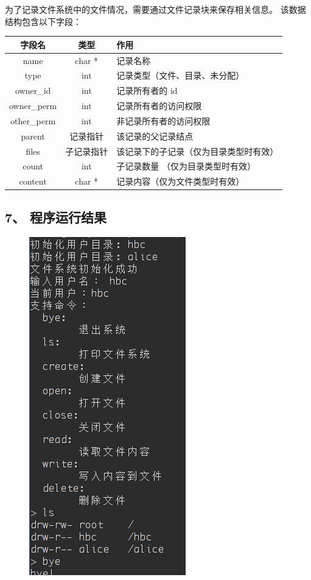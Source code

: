 \documentclass[12bp]{guo}
\begin{document}
为了记录文件系统中的文件情况，需要通过文件记录块来保存相关信息。
该数据结构包含以下字段：

\begin{table}[H]
    \centering
    \begin{tabular}{| c | c | l |}
        \hline
        字段名 & 类型 & 作用 \\ \hline
        name & char * & 记录名称 \\
        type & int & 记录类型（文件、目录、未分配） \\
        owner\_id & int & 记录所有者的 id \\
        owner\_perm & int & 记录所有者的访问权限 \\
        other\_perm & int & 非记录所有者的访问权限 \\
        parent & 记录指针 & 该记录的父记录结点 \\
        files & 子记录指针 & 该记录下的子记录（仅为目录类型时有效）\\
        count & int & 子记录数量 （仅为目录类型时有效） \\
        content & char * & 记录内容（仅为文件类型时有效） \\ \hline
    \end{tabular}
\end{table}

\clearpage

\subsection{7、 程序运行结果}

\begin{figure}[h!]
    \centering
        \includegraphics[scale=0.75]{figures/4.result.png}
\end{figure}
\end{document}
